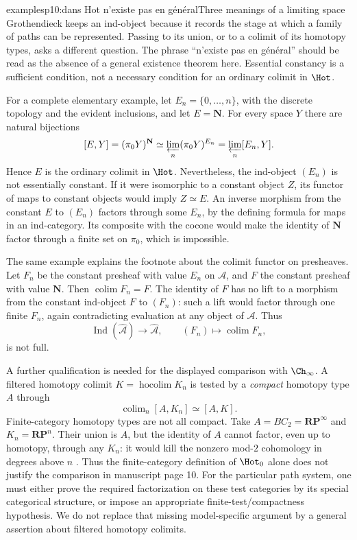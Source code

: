 \begin{dcomment}{examples}{p10:dans Hot n'existe pas en général}{Three meanings of a limiting space}
Grothendieck keeps an ind-object because it records the stage at which a family of paths can be represented. Passing to its union, or to a colimit of its homotopy types, asks a different question. The phrase ``n'existe pas en général'' should be read as the absence of a general existence theorem here. Essential constancy is a sufficient condition, not a necessary condition for an ordinary colimit in $\Hot$.

For a complete elementary example, let $E_n=\{0,\ldots,n\}$, with the discrete topology and the evident inclusions, and let $E=\mathbf N$. For every space $Y$ there are natural bijections
\[
 [E,Y]=(\pi_0Y)^{\mathbf N}
       \simeq\varprojlim_n(\pi_0Y)^{E_n}
       =\varprojlim_n[E_n,Y].
\]
Hence $E$ is the ordinary colimit in $\Hot$. Nevertheless, the ind-object $(E_n)$ is not essentially constant. If it were isomorphic to a constant object $Z$, its functor of maps to constant objects would imply $Z\simeq E$. An inverse morphism from the constant $E$ to $(E_n)$ factors through some $E_n$, by the defining formula for maps in an ind-category. Its composite with the cocone would make the identity of $\mathbf N$ factor through a finite set on $\pi_0$, which is impossible.

The same example explains the footnote about the colimit functor on presheaves. Let $F_n$ be the constant presheaf with value $E_n$ on $\mathcal A$, and $F$ the constant presheaf with value $\mathbf N$. Then $\operatorname{colim}F_n=F$. The identity of $F$ has no lift to a morphism from the constant ind-object $F$ to $(F_n)$: such a lift would factor through one finite $F_n$, again contradicting evaluation at any object of $\mathcal A$. Thus
\[
 \operatorname{Ind}(\widehat{\mathcal A})
       \longrightarrow\widehat{\mathcal A},\qquad
 (F_n)\longmapsto\operatorname{colim}F_n,
\]
is not full.

A further qualification is needed for the displayed comparison with $\Ch_\infty$. A filtered homotopy colimit $K=\operatorname{hocolim}K_n$ is tested by a \emph{compact} homotopy type $A$ through
\[
 \operatorname{colim}_n[A,K_n]\simeq[A,K].
\]
Finite-category homotopy types are not all compact. Take $A=BC_2=\mathbf{RP}^{\infty}$ and $K_n=\mathbf{RP}^{n}$. Their union is $A$, but the identity of $A$ cannot factor, even up to homotopy, through any $K_n$: it would kill the nonzero mod-$2$ cohomology in degrees above $n$ \citep[Theorem~3.19]{Hatcher2002}. Thus the finite-category definition of $\Hot_0$ alone does not justify the comparison in manuscript page 10. For the particular path system, one must either prove the required factorization on these test categories by its special categorical structure, or impose an appropriate finite-test/compactness hypothesis. We do not replace that missing model-specific argument by a general assertion about filtered homotopy colimits.
\end{dcomment}
